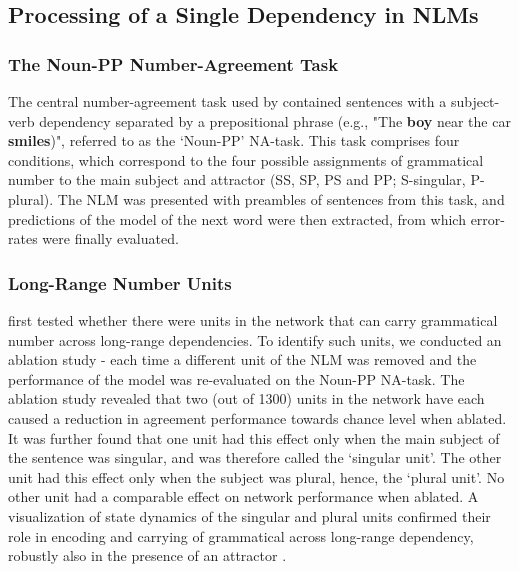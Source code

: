 \subsection{Processing of a Single Dependency in NLMs}
\subsubsection{The Noun-PP Number-Agreement Task}
The central number-agreement task used by \citet{lakretz2019emergence} contained sentences with a subject-verb dependency separated by a prepositional phrase (e.g., "The \textbf{boy} near the car \textbf{smiles})", referred to as the `Noun-PP' NA-task. 
This task comprises four conditions, which correspond to the four possible assignments of grammatical number to the main subject and attractor (SS, SP, PS and PP; S-singular, P-plural). The NLM was presented with preambles of sentences from this task, and predictions of the model of the next word were then extracted, from which error-rates were finally evaluated. 

\subsubsection{Long-Range Number Units}
\citet{lakretz2019emergence} first tested whether there were units in the network that can carry grammatical number across long-range dependencies. 
To identify such units, we conducted an ablation study - each time a different unit of the NLM was removed and the performance of the model was re-evaluated on the Noun-PP NA-task. 
The ablation study revealed that two (out of 1300) units in the network have each caused a reduction in agreement performance towards chance level when ablated. It was further found that one unit had this effect only when the main subject of the sentence was singular, and was therefore called the `singular unit'. 
The other unit had this effect only when the subject was plural, hence, the `plural unit'. 
No other unit had a comparable effect on network performance when ablated. A visualization of state dynamics of the singular and plural units confirmed their role in encoding and carrying of grammatical across long-range dependency, robustly also in the presence of an attractor \citep[figure 1 in][]{lakretz2019emergence}.


